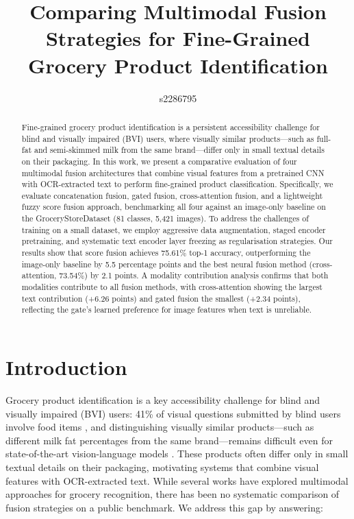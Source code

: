 \documentclass[10pt,twocolumn]{article}
\title{\vspace{-1cm}Comparing Multimodal Fusion Strategies for Fine-Grained\\Grocery Product Identification}
\author{s2286795}
\date{}
\begin{document}
\maketitle
\thispagestyle{fancy}

\begin{abstract}
Fine-grained grocery product identification is a persistent accessibility challenge for blind and visually impaired (BVI) users, where visually similar products---such as full-fat and semi-skimmed milk from the same brand---differ only in small textual details on their packaging. In this work, we present a comparative evaluation of four multimodal fusion architectures that combine visual features from a pretrained CNN with OCR-extracted text to perform fine-grained product classification. Specifically, we evaluate concatenation fusion, gated fusion, cross-attention fusion, and a lightweight fuzzy score fusion approach, benchmarking all four against an image-only baseline on the GroceryStoreDataset (81 classes, 5,421 images). To address the challenges of training on a small dataset, we employ aggressive data augmentation, staged encoder pretraining, and systematic text encoder layer freezing as regularisation strategies. Our results show that score fusion achieves 75.61\% top-1 accuracy, outperforming the image-only baseline by 5.5 percentage points and the best neural fusion method (cross-attention, 73.54\%) by 2.1 points. A modality contribution analysis confirms that both modalities contribute to all fusion methods, with cross-attention showing the largest text contribution (+6.26 points) and gated fusion the smallest (+2.34 points), reflecting the gate's learned preference for image features when text is unreliable.
\end{abstract}

\section{Introduction}
\label{sec:introduction}

Grocery product identification is a key accessibility challenge for blind and visually impaired (BVI) users: 41\% of visual questions submitted by blind users involve food items \citep{brady2013visual}, and distinguishing visually similar products---such as different milk fat percentages from the same brand---remains difficult even for state-of-the-art vision-language models \citep{garg2025trained, mathis2025lifeinsight}. These products often differ only in small textual details on their packaging, motivating systems that combine visual features with OCR-extracted text. While several works have explored multimodal approaches for grocery recognition, there has been no systematic comparison of fusion strategies on a public benchmark. We address this gap by answering:
\end{document}
